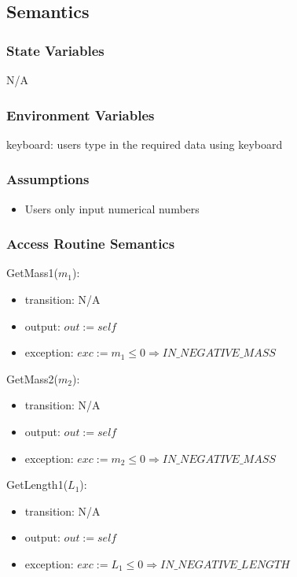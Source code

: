 \documentclass[12pt, titlepage]{article}
\begin{document}
\subsection{Semantics}

\subsubsection{State Variables}
N/A

\subsubsection{Environment Variables}
keyboard: users type in the required data using keyboard
\subsubsection{Assumptions}
\begin{itemize}
  \item Users only input numerical numbers
\end{itemize}

\subsubsection{Access Routine Semantics}

\noindent GetMass1($m_1$):
\begin{itemize}
\item transition: N/A
\item output: $out := self$
\item exception: $exc := m_1 \leq 0 \Rightarrow IN\_NEGATIVE\_MASS$
\end{itemize}

\noindent GetMass2($m_2$):
\begin{itemize}
\item transition: N/A
\item output: $out := self$
\item exception: $exc := m_2 \leq 0 \Rightarrow IN\_NEGATIVE\_MASS$
\end{itemize}

\noindent GetLength1($L_1$):
\begin{itemize}
\item transition: N/A
\item output: $out := self$
\item exception: $exc := L_1 \leq 0 \Rightarrow IN\_NEGATIVE\_LENGTH$
\end{itemize}
\end{document}
